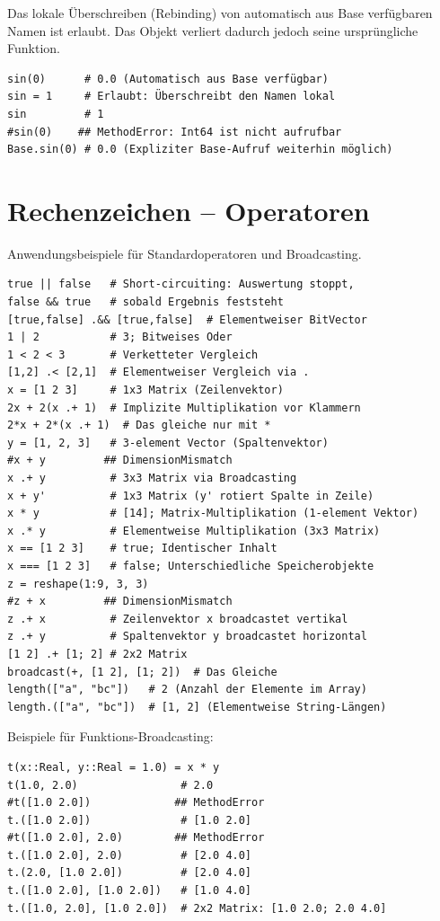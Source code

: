 \documentclass[10pt,twocolumn]{scrartcl}
\begin{document}
Das lokale Überschreiben (Rebinding) von automatisch aus 
Base verfügbaren Namen ist erlaubt. Das Objekt verliert 
dadurch jedoch seine ursprüngliche Funktion.

\begin{lstlisting}
sin(0)      # 0.0 (Automatisch aus Base verfügbar)
sin = 1     # Erlaubt: Überschreibt den Namen lokal
sin         # 1
#sin(0)    ## MethodError: Int64 ist nicht aufrufbar
Base.sin(0) # 0.0 (Expliziter Base-Aufruf weiterhin möglich)
\end{lstlisting}

\section{Rechenzeichen -- Operatoren}
\label{sec:operatoren}

Anwendungsbeispiele für Standardoperatoren und Broadcasting.

\begin{lstlisting}
true || false   # Short-circuiting: Auswertung stoppt,
false && true   # sobald Ergebnis feststeht
[true,false] .&& [true,false]  # Elementweiser BitVector
1 | 2           # 3; Bitweises Oder
1 < 2 < 3       # Verketteter Vergleich
[1,2] .< [2,1]  # Elementweiser Vergleich via .
x = [1 2 3]     # 1x3 Matrix (Zeilenvektor)
2x + 2(x .+ 1)  # Implizite Multiplikation vor Klammern
2*x + 2*(x .+ 1)  # Das gleiche nur mit *
y = [1, 2, 3]   # 3-element Vector (Spaltenvektor)
#x + y         ## DimensionMismatch
x .+ y          # 3x3 Matrix via Broadcasting
x + y'          # 1x3 Matrix (y' rotiert Spalte in Zeile)
x * y           # [14]; Matrix-Multiplikation (1-element Vektor)
x .* y          # Elementweise Multiplikation (3x3 Matrix)
x == [1 2 3]    # true; Identischer Inhalt
x === [1 2 3]   # false; Unterschiedliche Speicherobjekte
z = reshape(1:9, 3, 3)
#z + x         ## DimensionMismatch
z .+ x          # Zeilenvektor x broadcastet vertikal
z .+ y          # Spaltenvektor y broadcastet horizontal
[1 2] .+ [1; 2] # 2x2 Matrix
broadcast(+, [1 2], [1; 2])  # Das Gleiche
length(["a", "bc"])   # 2 (Anzahl der Elemente im Array)
length.(["a", "bc"])  # [1, 2] (Elementweise String-Längen)
\end{lstlisting}

Beispiele für Funktions-Broadcasting:
\begin{lstlisting}
t(x::Real, y::Real = 1.0) = x * y
t(1.0, 2.0)                # 2.0
#t([1.0 2.0])             ## MethodError
t.([1.0 2.0])              # [1.0 2.0]
#t([1.0 2.0], 2.0)        ## MethodError
t.([1.0 2.0], 2.0)         # [2.0 4.0]
t.(2.0, [1.0 2.0])         # [2.0 4.0]
t.([1.0 2.0], [1.0 2.0])   # [1.0 4.0]
t.([1.0, 2.0], [1.0 2.0])  # 2x2 Matrix: [1.0 2.0; 2.0 4.0]
\end{lstlisting}
\end{document}
